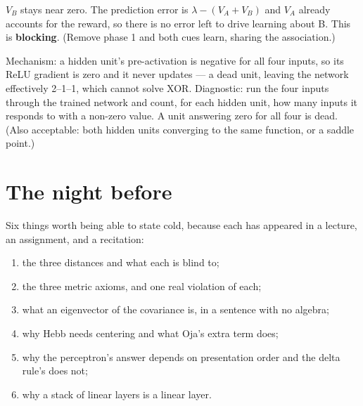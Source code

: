 \documentclass[11pt]{article}
\begin{document}
 $V_B$ stays near zero. The prediction error is $\lambda - (V_A + V_B)$
and $V_A$ already accounts for the reward, so there is no error left to drive
learning about B. This is \textbf{blocking}. (Remove phase 1 and both cues learn,
sharing the association.)

 Mechanism: a hidden unit's pre-activation is negative for all four
inputs, so its ReLU gradient is zero and it never updates --- a dead unit,
leaving the network effectively 2--1--1, which cannot solve XOR. Diagnostic:
run the four inputs through the trained network and count, for each hidden unit,
how many inputs it responds to with a non-zero value. A unit answering zero for
all four is dead. (Also acceptable: both hidden units converging to the same
function, or a saddle point.)

\section*{The night before}

Six things worth being able to state cold, because each has appeared in a
lecture, an assignment, and a recitation:

\begin{enumerate}
  \item the three distances and what each is blind to;
  \item the three metric axioms, and one real violation of each;
  \item what an eigenvector of the covariance is, in a sentence with no algebra;
  \item why Hebb needs centering and what Oja's extra term does;
  \item why the perceptron's answer depends on presentation order and the delta
        rule's does not;
  \item why a stack of linear layers is a linear layer.
\end{enumerate}
\end{document}
